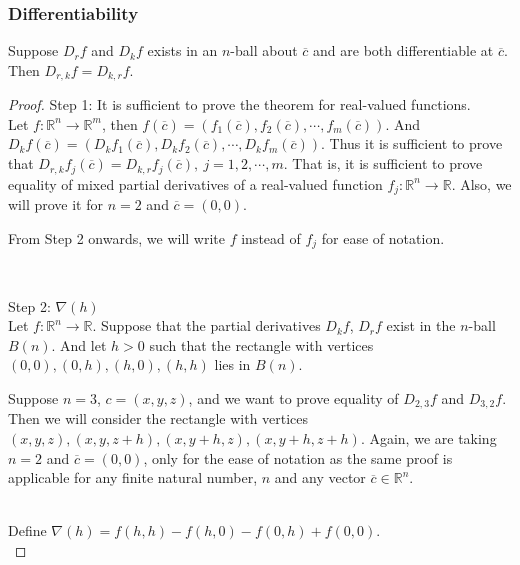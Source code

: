 \subsubsection{Differentiability}
\begin{theorem}
	Suppose $D_r f$ and $D_k f$ exists in an $n$-ball about $\overline{c}$ and are both differentiable at $\overline{c}$.
	Then $D_{r,k} f = D_{k,r} f$.
\end{theorem}
\begin{proof}
	\par{Step 1:} It is sufficient to prove the theorem for real-valued functions.\\
	
	Let $f : \mathbb{R}^n \to \mathbb{R}^m$, then $f(\overline{c}) = \left( f_1(\overline{c}),f_2(\overline{c}),\cdots,f_m(\overline{c}) \right)$.
	And $D_k f(\overline{c}) = \left( D_k f_1(\overline{c}), D_k f_2(\overline{c}), \cdots, D_k f_m(\overline{c}) \right)$.
	Thus it is sufficient to prove that $D_{r,k}f_j(\overline{c}) = D_{k,r}f_j(\overline{c}),\ j = 1,2,\cdots,m$.
	That is, it is sufficient to prove equality of mixed partial derivatives of a real-valued function $f_j : \mathbb{R}^n \to \mathbb{R}$.
	Also, we will prove it for $n = 2$ and $\overline{c} = (0,0)$.
	\begin{commentary} From Step 2 onwards, we will write $f$ instead of $f_j$ for ease of notation. \end{commentary}\\

	\par{Step 2:} $\nabla(h)$\\

	Let $f : \mathbb{R}^n \to \mathbb{R}$.
	Suppose that the partial derivatives $D_k f$, $D_r f$ exist in the $n$-ball $B(n)$.
	And let $h > 0$ such that the rectangle with vertices $(0,0), (0,h), (h,0), (h,h)$ lies in $B(n)$.
	\begin{commentary} Suppose $n=3$, $c = (x,y,z)$, and we want to prove equality of $D_{2,3} f$ and $D_{3,2} f$.
	Then we will consider the rectangle with vertices $(x,y,z), (x,y,z+h), (x,y+h,z), (x,y+h,z+h)$.
	Again, we are taking $n=2$ and $\overline{c} = (0,0)$, only for the ease of notation as the same proof is applicable for any finite natural number, $n$ and any vector $\overline{c} \in \mathbb{R}^n$.\end{commentary}\\
	
	Define $\nabla(h) = f(h,h)-f(h,0)-f(0,h)+f(0,0)$.\\
	

\end{proof}

